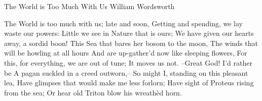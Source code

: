 \begin{poem}
{The World is Too Much With Us}
{ William Wordsworth}

The World is too much with us; late and soon,		
 Getting and spending, we lay waste our powers:		
 Little we see in Nature that is ours;		
 We have given our hearts away, a sordid boon!		
 This Sea that bares her bosom to the moon,		
 The winds that will be howling at all hours		
 And are up-gather'd now like sleeping flowers,		
 For this, for everything, we are out of tune;		
 It moves us not. --Great God! I'd rather be		
 A pagan suckled in a creed outworn,--		
 So might I, standing on this pleasant lea,		
 Have glimpses that would make me less forlorn;		
 Have sight of Proteus rising from the sea;		
 Or hear old Triton blow his wreath\`{e}d horn.		
 \end{poem}
